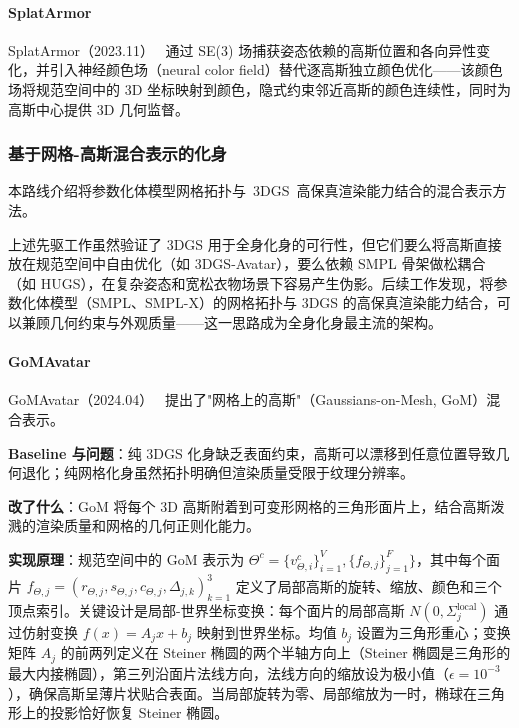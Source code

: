 \paragraph{SplatArmor}

SplatArmor（2023.11）~\cite{2311_10812} 通过 SE(3) 场捕获姿态依赖的高斯位置和各向异性变化，并引入神经颜色场（neural color field）替代逐高斯独立颜色优化——该颜色场将规范空间中的 3D 坐标映射到颜色，隐式约束邻近高斯的颜色连续性，同时为高斯中心提供 3D 几何监督。

\subsubsection{基于网格-高斯混合表示的化身}

本路线介绍将参数化体模型网格拓扑与~3DGS~高保真渲染能力结合的混合表示方法。

上述先驱工作虽然验证了 3DGS 用于全身化身的可行性，但它们要么将高斯直接放在规范空间中自由优化（如 3DGS-Avatar），要么依赖 SMPL 骨架做松耦合（如 HUGS），在复杂姿态和宽松衣物场景下容易产生伪影。后续工作发现，将参数化体模型（SMPL、SMPL-X）的网格拓扑与 3DGS 的高保真渲染能力结合，可以兼顾几何约束与外观质量——这一思路成为全身化身最主流的架构。

\paragraph{GoMAvatar}

GoMAvatar（2024.04）~\cite{2404_07991} 提出了"网格上的高斯"（Gaussians-on-Mesh, GoM）混合表示。

\textbf{Baseline 与问题}：纯 3DGS 化身缺乏表面约束，高斯可以漂移到任意位置导致几何退化；纯网格化身虽然拓扑明确但渲染质量受限于纹理分辨率。

\textbf{改了什么}：GoM 将每个 3D 高斯附着到可变形网格的三角形面片上，结合高斯泼溅的渲染质量和网格的几何正则化能力。

\textbf{实现原理}：规范空间中的 GoM 表示为 $\Theta^c = \{v_{\Theta,i}^c\}_{i=1}^{V}, \{f_{\Theta,j}\}_{j=1}^{F}\}$，其中每个面片 $f_{\Theta,j} = (r_{\Theta,j}, s_{\Theta,j}, c_{\Theta,j}, \Delta_{j,k})_{k=1}^{3}$ 定义了局部高斯的旋转、缩放、颜色和三个顶点索引。关键设计是局部-世界坐标变换：每个面片的局部高斯 $N(0, \Sigma_j^{\text{local}})$ 通过仿射变换 $f(x) = A_j x + b_j$ 映射到世界坐标。均值 $b_j$ 设置为三角形重心；变换矩阵 $A_j$ 的前两列定义在 Steiner 椭圆的两个半轴方向上（Steiner 椭圆是三角形的最大内接椭圆），第三列沿面片法线方向，法线方向的缩放设为极小值（$\epsilon = 10^{-3}$），确保高斯呈薄片状贴合表面。当局部旋转为零、局部缩放为一时，椭球在三角形上的投影恰好恢复 Steiner 椭圆。

